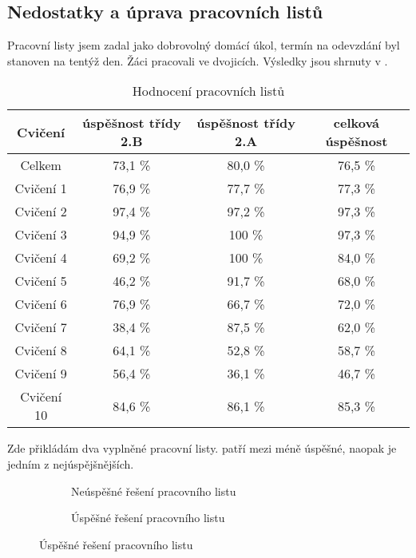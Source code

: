 \subsection{Nedostatky a úprava pracovních listů}
{Pracovní listy jsem zadal jako dobrovolný domácí úkol, termín na odevzdání byl stanoven na tentýž den. Žáci pracovali ve dvojicích. Výsledky jsou shrnuty v .}
\begin{table}[H]
    \centering
    \begin{tabular}{|c|c|c|c|}
        \hline
        Cvičení & úspěšnost třídy 2.B & úspěšnost třídy 2.A & celková úspěšnost\\
        \hline
        Celkem & 73,1 \% & 80,0 \% & 76,5 \%\\
        Cvičení 1 & 76,9 \% & 77,7 \% & 77,3 \%\\
        Cvičení 2 & 97,4 \% & 97,2 \% & 97,3 \%\\
        Cvičení 3 & 94,9 \% & 100 \% & 97,3 \%\\
        Cvičení 4 & 69,2 \% & 100 \% & 84,0 \%\\
        Cvičení 5 & 46,2 \% & 91,7 \% & 68,0 \%\\
        Cvičení 6 & 76,9 \% & 66,7 \% & 72,0 \%\\
        Cvičení 7 & 38,4 \% & 87,5 \% & 62,0 \%\\
        Cvičení 8 & 64,1 \% & 52,8 \% & 58,7 \%\\
        Cvičení 9 & 56,4 \% & 36,1 \% & 46,7 \%\\
        Cvičení 10 & 84,6 \% & 86,1 \% & 85,3 \%\\
        \hline
    \end{tabular}
    \caption{Hodnocení pracovních listů \jaTab}
    \label{tab:vysledkyPracovnichListu}
\end{table}
{Zde přikládám dva vyplněné pracovní listy.  patří mezi méně úspěšné, naopak  je jedním z nejúspějšnějších.}
\begin{figure}[H]
    \begin{subfigure}{\textwidth}
        \centering
        \hspace{1cm}
        \caption{Neúspěšné řešení pracovního listu \jaObr}
        \label{obr:prikladNeuspesny}
    \end{subfigure}\odst
    \begin{subfigure}{\textwidth}
        \centering
        \hspace{1cm}
        \caption{Úspěšné řešení pracovního listu \jaObr}
        \label{obr:prikladUspesny}
    \end{subfigure}
\end{figure}
